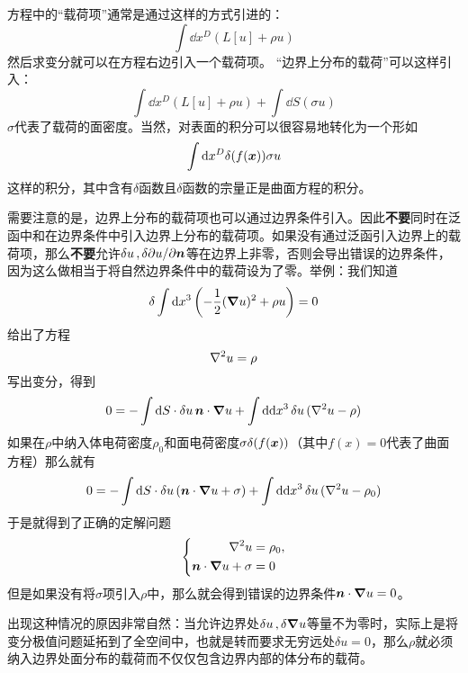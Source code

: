 \documentclass[UTF8]{ctexart}
\begin{document}
方程中的“载荷项”通常是通过这样的方式引进的：
\begin{equation}
    \int \dd x^D (L[u] + \rho u)
\end{equation}
然后求变分就可以在方程右边引入一个载荷项。
“边界上分布的载荷”可以这样引入：
\begin{equation}
    \int \dd x^D (L[u] + \rho u) + \int \dd S (\sigma u)
\end{equation}
$\sigma$代表了载荷的面密度。当然，对表面的积分可以很容易地转化为一个形如
\[
    \int \dd x^D \delta(f(\vb*{x})) \sigma u
\]
这样的积分，其中含有$\delta$函数且$\delta$函数的宗量正是曲面方程的积分。

需要注意的是，边界上分布的载荷项也可以通过边界条件引入。因此\textbf{不要}同时在泛函中和在边界条件中引入边界上分布的载荷项。如果没有通过泛函引入边界上的载荷项，那么\textbf{不要}允许$\var{u},\var{\partial u / \partial \vb*{n}}$等在边界上非零，否则会导出错误的边界条件，因为这么做相当于将自然边界条件中的载荷设为了零。举例：我们知道
\[
    \var{\int \dd x^3 \left( - \frac{1}{2} (\grad{u})^2 + \rho u \right)} = 0
\]
给出了方程
\[
    \laplacian u = \rho
\]
写出变分，得到
\[
    0 = - \int \dd S \cdot \var{u} \vb*{n} \cdot \grad{u} + \int \dd \dd x^3 \var{u} (\laplacian u - \rho)
\]
如果在$\rho$中纳入体电荷密度$\rho_0$和面电荷密度$\sigma \delta(f(\vb*{x}))$（其中$f(x)=0$代表了曲面方程）那么就有
\[
    0 = - \int \dd S \cdot \var{u} (\vb*{n} \cdot \grad{u} + \sigma) + \int \dd \dd x^3 \var{u} (\laplacian u - \rho_0)
\]
于是就得到了正确的定解问题
\[
    \left\{
        \begin{aligned}
            \laplacian u &= \rho_0, \\
            \vb*{n} \cdot \grad{u} + \sigma &= 0
        \end{aligned}
    \right.
\]
但是如果没有将$\sigma$项引入$\rho$中，那么就会得到错误的边界条件$\vb*{n} \cdot \grad{u} = 0$。

出现这种情况的原因非常自然：当允许边界处$\var{u},\var{\grad{u}}$等量不为零时，实际上是将变分极值问题延拓到了全空间中，也就是转而要求无穷远处$\delta u = 0$，那么$\rho$就必须纳入边界处面分布的载荷而不仅仅包含边界内部的体分布的载荷。
\end{document}
